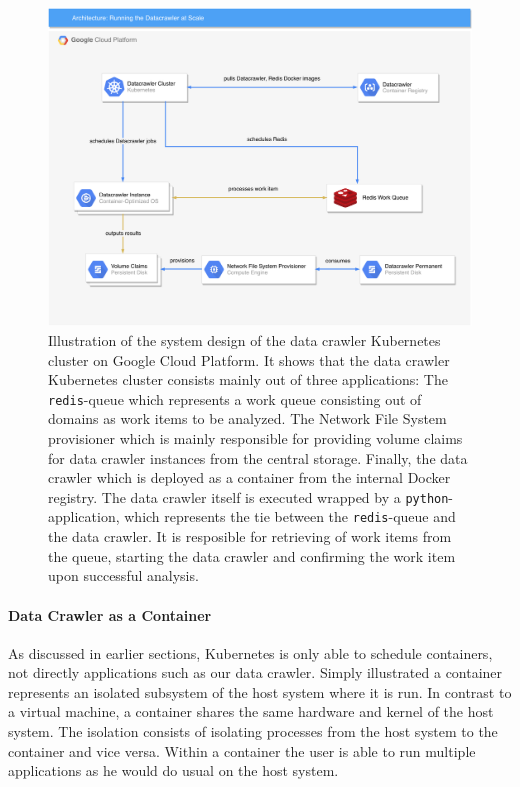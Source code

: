 \begin{figure}
	\centering
	\includegraphics[scale=0.5]{resources/datacrawler_k8s_architecture}
	\caption[System design of "Running the data crawler at Scale"]{Illustration of the system design of the data crawler Kubernetes cluster on Google Cloud Platform. It shows that the data crawler Kubernetes cluster consists mainly out of three applications: The \texttt{redis}-queue which represents a work queue consisting out of domains as work items to be analyzed. The Network File System provisioner which is mainly responsible for providing volume claims for data crawler instances from the central storage. Finally, the data crawler which is deployed as a container from the internal Docker registry. The data crawler itself is executed wrapped by a \texttt{python}-application, which represents the tie between the \texttt{redis}-queue and the data crawler. It is resposible for retrieving of work items from the queue, starting the data crawler and confirming the work item upon successful analysis.}
	\label{datacrawler_k8s_architecture}
\end{figure}
\paragraph*{Data Crawler as a Container}
\label{datacrawler_container}

As discussed in earlier sections, Kubernetes is only able to schedule containers, not directly applications such as our data crawler. Simply illustrated a container represents an isolated subsystem of the host system where it is run. In contrast to a virtual machine, a container shares the same hardware and kernel of the host system. The isolation consists of isolating processes from the host system to the container and vice versa. Within a container the user is able to run multiple applications as he would do usual on the host system. 

